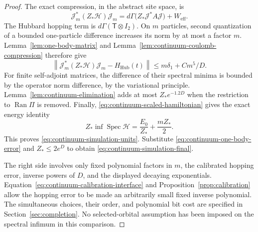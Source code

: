 \begin{proof}
The exact compression, in the abstract site space, is
\[
 \mathcal J_m^*(Z_*\mathcal H)\mathcal J_m
 =d\Gamma\bigl(Z_*\mathcal J^*A\mathcal J\bigr)
    +W_{\mathrm{eff}}.
\]
The Hubbard hopping term is
\(d\Gamma(\mathsf T\otimes I_2)\).
On \(m\) particles, second quantization of a bounded
one-particle difference increases its norm by at most a
factor \(m\).  Lemma~\ref{lem:one-body-matrix} and
Lemma~\ref{lem:continuum-coulomb-compression} therefore give
\[
 \left\|\mathcal J_m^*(Z_*\mathcal H)\mathcal J_m
             -H_{\mathrm{Hub}}(t)\right\|
 \le m\delta_1+Cm^5/D.
\]
For finite self-adjoint matrices, the difference of their
spectral minima is bounded by the operator norm difference,
by the variational principle.  Lemma~\ref{lem:continuum-elimination}
adds at most \(Z_*e^{-1.2D}\) when the restriction to
\(\operatorname{Ran}\Pi\) is removed.
Finally, \eqref{eq:continuum-scaled-hamiltonian} gives the
exact energy identity
\[
 Z_*\inf\operatorname{Spec}\mathcal H
 =\frac{E_0}{Z_*}+\frac{mZ_*}{2}.
\]
This proves \eqref{eq:continuum-simulation-units}.
Substitute \eqref{eq:continuum-one-body-error} and
\(Z_*\le2e^D\) to obtain
\eqref{eq:continuum-simulation-final}.

The right side involves only fixed polynomial factors in
\(m\), the calibrated hopping error, inverse powers of \(D\),
and the displayed decaying exponentials.
Equation~\eqref{eq:continuum-calibration-interface} and
Proposition~\ref{prop:calibration} allow the hopping error
to be made an arbitrarily small fixed inverse polynomial.
The simultaneous choices, their order, and polynomial bit
cost are specified in Section~\ref{sec:completion}.
No selected-orbital assumption has been imposed on the
spectral infimum in this comparison.
\end{proof}
